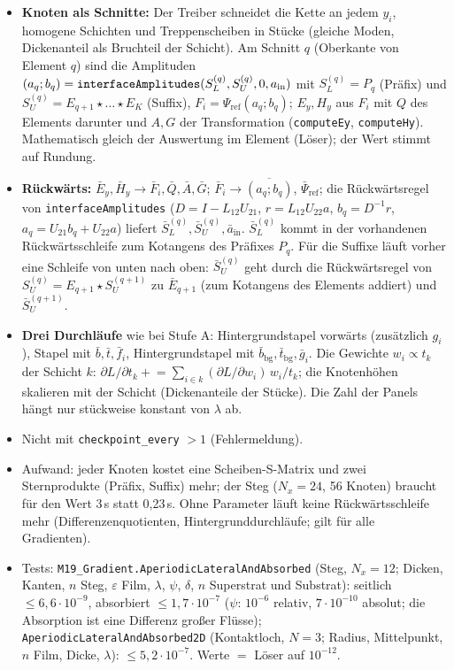 \begin{itemize}[nosep]
  \item \textbf{Knoten als Schnitte:} Der Treiber schneidet die Kette an jedem $y_i$, homogene Schichten und
        Treppenscheiben in Stücke (gleiche Moden, Dickenanteil als Bruchteil der Schicht). Am Schnitt $q$ (Oberkante von
        Element $q$) sind die Amplituden $(a_q;b_q)=\verb|interfaceAmplitudes|(S_L^{(q)},S_U^{(q)},0,a_{\text{in}})$ mit
        $S_L^{(q)}=P_q$ (Präfix) und $S_U^{(q)}=E_{q+1}\star\dots\star E_K$ (Suffix), $F_i=\Psi_{\text{ref}}(a_q;b_q)$;
        $E_y,H_y$ aus $F_i$ mit $Q$ des Elements darunter und $A,G$ der Transformation (\verb|computeEy|,
        \verb|computeHy|). Mathematisch gleich der Auswertung im Element (Löser); der Wert stimmt auf Rundung.
  \item \textbf{Rückwärts:} $\bar E_y,\bar H_y\to\bar F_i,\bar Q,\bar A,\bar G$; $\bar F_i\to\overline{(a_q;b_q)}$,
        $\bar\Psi_{\text{ref}}$; die Rückwärtsregel von \verb|interfaceAmplitudes| ($D=I-L_{12}U_{21}$, $r=L_{12}U_{22}a$,
        $b_q=D^{-1}r$, $a_q=U_{21}b_q+U_{22}a$) liefert $\bar S_L^{(q)},\bar S_U^{(q)},\bar a_{\text{in}}$. $\bar S_L^{(q)}$
        kommt in der vorhandenen Rückwärtsschleife zum Kotangens des Präfixes $P_q$. Für die Suffixe läuft vorher eine
        Schleife von unten nach oben: $\bar S_U^{(q)}$ geht durch die Rückwärtsregel von $S_U^{(q)}=E_{q+1}\star
        S_U^{(q+1)}$ zu $\bar E_{q+1}$ (zum Kotangens des Elements addiert) und $\bar S_U^{(q+1)}$.
  \item \textbf{Drei Durchläufe} wie bei Stufe A: Hintergrundstapel vorwärts (zusätzlich $g_i$), Stapel mit
        $\bar b,\bar t,\bar f_i$, Hintergrundstapel mit $\bar b_{\text{bg}},\bar t_{\text{bg}},\bar g_i$. Die Gewichte
        $w_i\propto t_k$ der Schicht $k$: $\partial L/\partial t_k\mathrel{+}=\sum_{i\in k}(\partial L/\partial w_i)\,w_i/t_k$;
        die Knotenhöhen skalieren mit der Schicht (Dickenanteile der Stücke). Die Zahl der Panels hängt nur stückweise
        konstant von $\lambda$ ab.
  \item Nicht mit \verb|checkpoint_every| $>1$ (Fehlermeldung).
  \item Aufwand: jeder Knoten kostet eine Scheiben-S-Matrix und zwei Sternprodukte (Präfix, Suffix) mehr; der Steg
        ($N_x=24$, 56 Knoten) braucht für den Wert 3\,s statt 0{,}23\,s. Ohne Parameter läuft keine Rückwärtsschleife
        mehr (Differenzenquotienten, Hintergrunddurchläufe; gilt für alle Gradienten).
  \item Tests: \verb|M19_Gradient.AperiodicLateralAndAbsorbed| (Steg, $N_x=12$; Dicken, Kanten, $n$ Steg, $\varepsilon$ Film,
        $\lambda$, $\psi$, $\delta$, $n$ Superstrat und Substrat): seitlich $\le6{,}6\cdot10^{-9}$, absorbiert $\le1{,}7\cdot10^{-7}$
        ($\psi$: $10^{-6}$ relativ, $7\cdot10^{-10}$ absolut; die Absorption ist eine Differenz großer Flüsse);
        \verb|AperiodicLateralAndAbsorbed2D| (Kontaktloch, $N=3$; Radius, Mittelpunkt, $n$ Film, Dicke, $\lambda$):
        $\le5{,}2\cdot10^{-7}$. Werte $=$ Löser auf $10^{-12}$.
\end{itemize}

